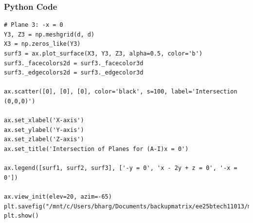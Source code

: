 \documentclass{beamer}
\begin{document}
\begin{frame}[fragile]
    \frametitle{Python Code}
    \begin{lstlisting}
# Plane 3: -x = 0
Y3, Z3 = np.meshgrid(d, d)
X3 = np.zeros_like(Y3)
surf3 = ax.plot_surface(X3, Y3, Z3, alpha=0.5, color='b')
surf3._facecolors2d = surf3._facecolor3d
surf3._edgecolors2d = surf3._edgecolor3d

ax.scatter([0], [0], [0], color='black', s=100, label='Intersection (0,0,0)')

ax.set_xlabel('X-axis')
ax.set_ylabel('Y-axis')
ax.set_zlabel('Z-axis')
ax.set_title('Intersection of Planes for (A-I)x = 0')

ax.legend([surf1, surf2, surf3], ['-y = 0', 'x - 2y + z = 0', '-x = 0'])

ax.view_init(elev=20, azim=-65)
plt.savefig("/mnt/c/Users/bharg/Documents/backupmatrix/ee25btech11013/matgeo/12.755/figs/Figure_1.png")
plt.show()


    \end{lstlisting}
\end{frame}
\end{document}

